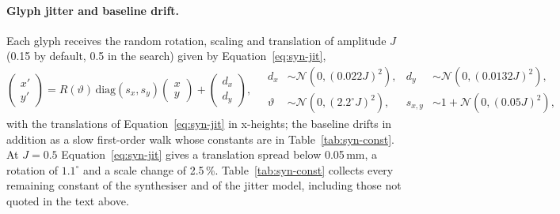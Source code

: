 \paragraph{Glyph jitter and baseline drift.}
Each glyph receives the random rotation, scaling and translation of amplitude $J$ (0.15 by default, 0.5 in the search) given by Equation~\ref{eq:syn-jit},
\begin{equation}
\begin{pmatrix}x'\\y'\end{pmatrix}=R(\vartheta)\,\mathrm{diag}(s_x,s_y)\begin{pmatrix}x\\y\end{pmatrix}+\begin{pmatrix}d_x\\d_y\end{pmatrix},\quad
\begin{aligned}d_x&\sim\mathcal N(0,(0.022J)^2),&d_y&\sim\mathcal N(0,(0.0132J)^2),\\\vartheta&\sim\mathcal N(0,(2.2^\circ J)^2),&s_{x,y}&\sim1+\mathcal N(0,(0.05J)^2),\end{aligned}
\label{eq:syn-jit}
\end{equation}
with the translations of Equation~\ref{eq:syn-jit} in x-heights; the baseline drifts in addition as a slow first-order walk whose constants are in Table~\ref{tab:syn-const}.
At $J=0.5$ Equation~\ref{eq:syn-jit} gives a translation spread below 0.05\,mm, a rotation of $1.1^\circ$ and a scale change of 2.5\,\%.
Table~\ref{tab:syn-const} collects every remaining constant of the synthesiser and of the jitter model, including those not quoted in the text above.

